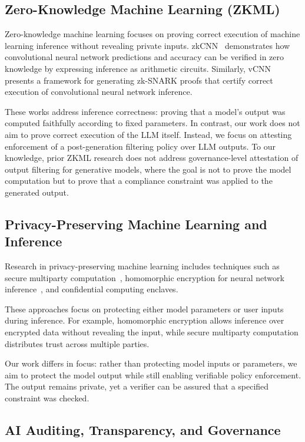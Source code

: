 \documentclass[10pt,conference,a4paper]{IEEEtran}
\begin{document}
\subsection{Zero-Knowledge Machine Learning (ZKML)}

Zero-knowledge machine learning focuses on proving correct execution of machine learning inference without revealing private inputs. zkCNN~\cite{liu2021zkcnn} demonstrates how convolutional neural network predictions and accuracy can be verified in zero knowledge by expressing inference as arithmetic circuits. Similarly, vCNN~\cite{lee2024vcnn} presents a framework for generating zk-SNARK proofs that certify correct execution of convolutional neural network inference.

These works address inference correctness: proving that a model’s output was computed faithfully according to fixed parameters. In contrast, our work does not aim to prove correct execution of the LLM itself. Instead, we focus on attesting enforcement of a post-generation filtering policy over LLM outputs. To our knowledge, prior ZKML research does not address governance-level attestation of output filtering for generative models, where the goal is not to prove the model computation but to prove that a compliance constraint was applied to the generated output.

\subsection{Privacy-Preserving Machine Learning and Inference}

Research in privacy-preserving machine learning includes techniques such as secure multiparty computation~\cite{lindell2009smpc}, homomorphic encryption for neural network inference~\cite{gilad2016cryptonets,brutzkus2019lowlatency}, and confidential computing enclaves.

These approaches focus on protecting either model parameters or user inputs during inference. For example, homomorphic encryption allows inference over encrypted data without revealing the input, while secure multiparty computation distributes trust across multiple parties.

Our work differs in focus: rather than protecting model inputs or parameters, we aim to protect the model output while still enabling verifiable policy enforcement. The output remains private, yet a verifier can be assured that a specified constraint was checked.

\subsection{AI Auditing, Transparency, and Governance}
\end{document}
